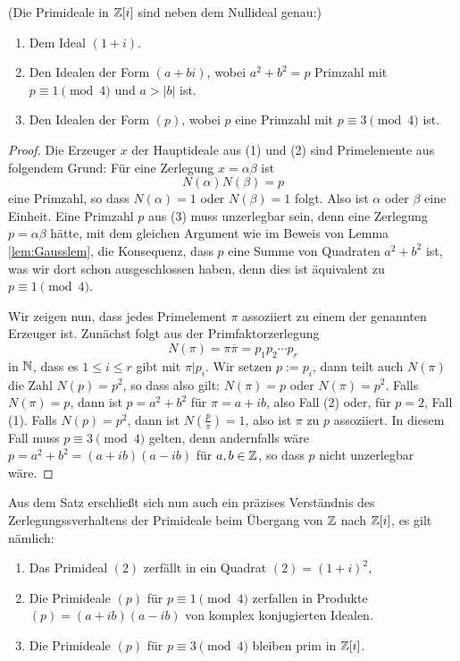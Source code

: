 \documentclass{book}
\begin{document}
\begin{thm}
    \label{thm:gaussprimes}
    (Die Primideale in $\mathbb{Z}[i]$ sind neben dem Nullideal genau:)
    \begin{enumerate}
        \item Dem Ideal $(1+i)$.
        \item Den Idealen der Form $(a + bi)$, wobei $a^2 + b^2 = p$ Primzahl mit $p \equiv 1 \pmod{4}$ und $a > |b|$ ist. 
        \item Den Idealen der Form $(p)$, wobei $p$ eine Primzahl mit $p \equiv 3 \pmod{4}$ ist.
    \end{enumerate}
\end{thm}
\begin{proof}
    Die Erzeuger $x$ der Hauptideale aus (1) und (2) sind Primelemente aus
    folgendem Grund: Für eine Zerlegung $x = \alpha \beta$ ist 
    \[
        N(\alpha) N(\beta) = p
    \]
    eine Primzahl, so dass $N(\alpha) = 1$ oder $N(\beta) = 1$ folgt. Also ist
    $\alpha$ oder $\beta$ eine Einheit. Eine Primzahl $p$ aus (3) muss
    unzerlegbar sein, denn eine Zerlegung $p = \alpha \beta$ hätte, mit dem
    gleichen Argument wie im Beweis von Lemma \ref{lem:Gausslem}, die Konsequenz,
    dass $p$ eine Summe von Quadraten $a^2 + b^2$ ist, was wir dort schon
    ausgeschlossen haben, denn dies ist äquivalent zu $p \equiv 1 \pmod{4}$.

    Wir zeigen nun, dass jedes Primelement $\pi$ assoziiert zu einem der
    genannten Erzeuger ist. Zunächst folgt aus der Primfaktorzerlegung
    \[
        N(\pi) = \pi \overline{\pi} = p_1 p_2 \cdots p_r
    \]
    in $\mathbb{N}$, dass es $1 \le i \le r$ gibt mit $\pi|p_i$. Wir setzen $p := p_i$,
    dann teilt auch $N(\pi)$ die Zahl $N(p) = p^2$, so dass also gilt: $N(\pi)
    = p$ oder $N(\pi) = p^2$. Falls $N(\pi) = p$, dann ist $p = a^2 + b^2$ für
    $\pi = a + ib$, also Fall (2) oder, für $p=2$, Fall (1). Falls $N(p) = p^2$,
    dann ist $N(\frac{p}{\pi}) = 1$, also ist $\pi$ zu $p$ assoziiert. In
    diesem Fall muss $p \equiv 3 \pmod{4}$ gelten, denn andernfalls wäre $p =
    a^2 + b^2 = (a +i b)(a-ib)$ für $a,b \in \mathbb{Z}$, so dass $p$ nicht
    unzerlegbar wäre. 
\end{proof}

\begin{exa}
    \label{exa:verzweigung}
    Aus dem Satz erschließt sich nun auch ein präzises Verständnis des
    Zerlegungssverhaltens der Primideale beim Übergang von $\mathbb{Z}$ nach
    $\mathbb{Z}[i]$, es gilt nämlich:
    \begin{enumerate}
        \item Das Primideal $(2)$ zerfällt in ein Quadrat $(2) = (1+i)^2$, 
        \item Die Primideale $(p)$ für $p \equiv 1 \pmod{4}$ zerfallen in
            Produkte $(p) = (a + i b)(a-ib)$ von komplex konjugierten Idealen. 
        \item Die Primideale $(p)$ für $p \equiv 3 \pmod{4}$ bleiben prim in $\mathbb{Z}[i]$.
    \end{enumerate}
\end{exa}
\end{document}
